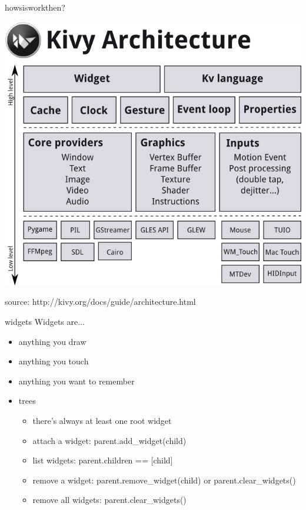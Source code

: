 \documentclass{beamer}
\begin{document}
\begin{frame}{howsisworkthen?}

\begin{center}
  \includegraphics[height=.75\textheight]{architecture.png}
\end{center}

source: http://kivy.org/docs/guide/architecture.html

\end{frame}


\begin{frame}{widgets}
Widgets are...
\pause
\begin{itemize}
  \item anything you draw
  \pause
  \item anything you touch
  \pause
  \item anything you want to remember
  \pause
  \item trees
    \begin{itemize}
    \pause
    \item there's always at least one root widget
    \pause
    \item attach a widget: parent.add\_widget(child)
    \pause
    \item list widgets: parent.children == [child]
    \pause
    \item remove a widget: parent.remove\_widget(child) or parent.clear\_widgets()
    \pause
    \item remove all widgets: parent.clear\_widgets()
    \end{itemize}
\end{itemize}
\end{frame}
\end{document}
